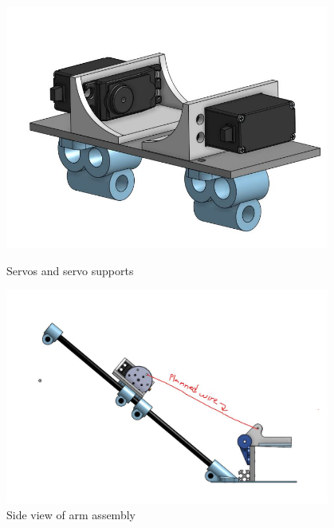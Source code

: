 \begin{figure}[ht]
\centering
\begin{minipage}[b]{.48\textwidth}
  \centering
  \includegraphics[width=0.95\textwidth]{Meetings/October/10-30-21/10-30-21_CAD_Figure6 - Nathan Forrer.JPG}
  \caption{Servos and servo supports}
  \label{fig:103021_5}
\end{minipage}%
\hfill%
\begin{minipage}[b]{.48\textwidth}
  \centering
  \includegraphics[width=0.95\textwidth]{Meetings/October/10-30-21/10-30-21_CAD_Figure7 - Nathan Forrer.JPG}
  \caption{Side view of arm assembly}
  \label{fig:103021_6}
\end{minipage}
\end{figure}

